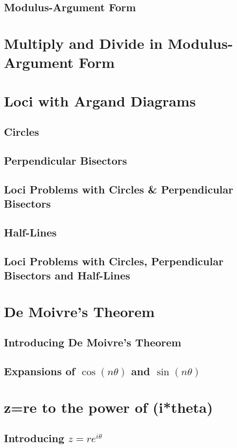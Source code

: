\documentclass[../alevelmaths.tex]{subfiles}
\begin{document}
\subsection*{Modulus-Argument Form}
\section{Multiply and Divide in Modulus-Argument Form}
\section{Loci with Argand Diagrams}
\subsection*{Circles}
\subsection*{Perpendicular Bisectors}
\subsection*{Loci Problems with Circles \& Perpendicular Bisectors}
\subsection*{Half-Lines}
\subsection*{Loci Problems with Circles, Perpendicular Bisectors and Half-Lines}
\section{De Moivre's Theorem}
\subsection*{Introducing De Moivre's Theorem}
\subsection*{Expansions of \texorpdfstring{$\cos(n\theta)$}{cos(n*theta)} and \texorpdfstring{$\sin(n\theta)$}{sin(n*theta)}}
\section{z=re to the power of (i*theta)}
\subsection*{Introducing \texorpdfstring{$z=re^{i\theta}$}{z=re to the power of i*theta}}
\end{document}

